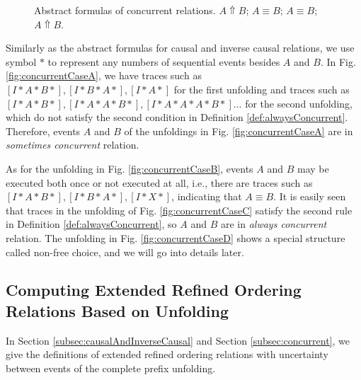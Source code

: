\documentclass{llncs}
\begin{document}
\begin{figure}[htbp]
{\begin{minipage}[b]{0.45\textwidth}
	\end{minipage}
	\label{fig:concurrentCaseC}
}
\caption{Abstract formulas of concurrent relations.  $A\Uparrow B$;  $A\equiv B$;  $A\equiv B$;  $A\Uparrow B$.}
\label{fig:concurrentCases}
\end{figure}

Similarly as the abstract formulas for causal and inverse causal relations, we use symbol $*$ to represent any numbers of sequential events besides $A$ and $B$. In Fig. \ref{fig:concurrentCaseA}, we have traces such as $[I*A*B*],[I*B*A*],[I*A*]$ for the first unfolding and traces such as $[I*A*B*],[I*A*A*B*],[I*A*A*A*B*]...$ for the second unfolding, which do not satisfy the second condition in Definition \ref{def:alwaysConcurrent}. Therefore, events $A$ and $B$ of the unfoldings in Fig. \ref{fig:concurrentCaseA} are in \textit{sometimes concurrent} relation.

As for the unfolding in Fig. \ref{fig:concurrentCaseB}, events $A$ and $B$ may be executed both once or not executed at all, i.e., there are traces such as $[I*A*B*],[I*B*A*],[I*X*]$, indicating that $A\equiv B$. It is easily seen that traces in the unfolding of Fig. \ref{fig:concurrentCaseC} satisfy the second rule in Definition \ref{def:alwaysConcurrent}, so $A$ and $B$ are in \textit{always concurrent} relation. The unfolding in Fig. \ref{fig:concurrentCaseD} shows a special structure called non-free choice, and we will go into details later.

\subsection{Computing Extended Refined Ordering Relations Based on Unfolding}\label{subsec:computationOfRelations}
In Section \ref{subsec:causalAndInverseCausal} and Section \ref{subsec:concurrent}, we give the definitions of extended refined ordering relations with uncertainty between events of the complete prefix unfolding. 
\end{document}
